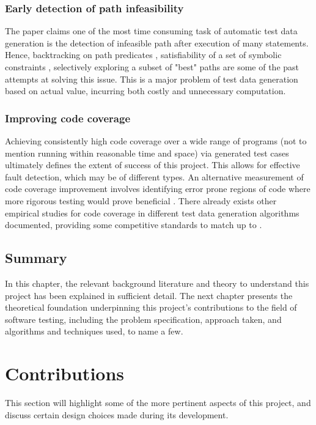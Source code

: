 \documentclass{icldt}
\numberwithin{equation}{section}       %
\newcommand{\blankpage}{
\newpage
\thispagestyle{empty}
\mbox{}
\newpage
}
\begin{document}
{\subsection{Early detection of path infeasibility}
The paper \cite{Tahbildar} claims one of the most time consuming task of automatic test data generation is the detection of infeasible path after execution of many statements. Hence, backtracking on path predicates \cite{Korel1990}, satisfiability of a set of symbolic constraints \cite{ZhangW01}, selectively exploring a subset of "best" paths \cite{Prather1987} are some of the past attempts at solving this issue. This is a major problem of test data generation based on actual value, incurring both costly and unnecessary computation.
\subsection{Improving code coverage}
Achieving consistently high code coverage over a wide range of programs (not to mention running within reasonable time and space) via generated test cases ultimately defines the extent of success of this project. This allows for effective fault detection, which may be of different types. An alternative measurement of code coverage improvement involves identifying error prone regions of code where more rigorous testing would prove beneficial \cite{Ntafos1988} \cite{InceDC1987}. There already exists other empirical studies for code coverage in different test data generation algorithms documented, providing some competitive standards to match up to \cite{Han2008} \cite{Rothermel99testcase} \cite{Lakhotia2009}.
\section{Summary}
In this chapter, the relevant background literature and theory to understand this project has been explained in sufficient detail. The next chapter presents the theoretical foundation underpinning this project's contributions to the field of software testing, including the problem specification, approach taken, and algorithms and techniques used, to name a few.
\blankpage
\chapter{Contributions}
\label{ch:contrib}
This section will highlight some of the more pertinent aspects of this project, and discuss certain design choices made during its development.

}
\end{document}
